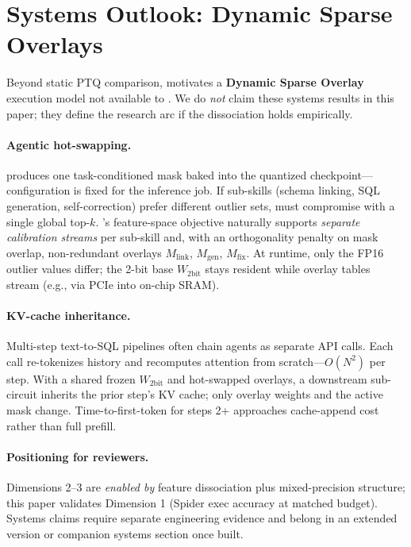 \section{Systems Outlook: Dynamic Sparse Overlays}
\label{sec:systems-outlook}

Beyond static PTQ comparison, \method{} motivates a \textbf{Dynamic Sparse Overlay} execution model
not available to \baseline{}.
We do \emph{not} claim these systems results in this paper; they define the research arc if the dissociation
holds empirically.

\paragraph{Agentic hot-swapping.}
\baseline{} produces one task-conditioned mask baked into the quantized checkpoint---configuration is
fixed for the inference job.
If sub-skills (schema linking, SQL generation, self-correction) prefer different outlier sets,
\baseline{} must compromise with a single global top-$k$.
\method{}'s feature-space objective naturally supports \emph{separate calibration streams} per
sub-skill and, with an orthogonality penalty on mask overlap, non-redundant overlays
$M_{\text{link}}$, $M_{\text{gen}}$, $M_{\text{fix}}$.
At runtime, only the FP16 outlier values differ; the 2-bit base $W_{\text{2bit}}$ stays resident while
overlay tables stream (e.g., via PCIe into on-chip SRAM).

\paragraph{KV-cache inheritance.}
Multi-step text-to-SQL pipelines often chain agents as separate API calls.
Each call re-tokenizes history and recomputes attention from scratch---$O(N^2)$ per step.
With a shared frozen $W_{\text{2bit}}$ and hot-swapped overlays, a downstream sub-circuit inherits the
prior step's KV cache; only overlay weights and the active \method{} mask change.
Time-to-first-token for steps 2+ approaches cache-append cost rather than full prefill.

\paragraph{Positioning for reviewers.}
Dimensions 2--3 are \emph{enabled by} feature dissociation plus mixed-precision structure; this
paper validates Dimension 1 (Spider exec accuracy at matched budget).
Systems claims require separate engineering evidence and belong in an extended version or companion
systems section once built.
